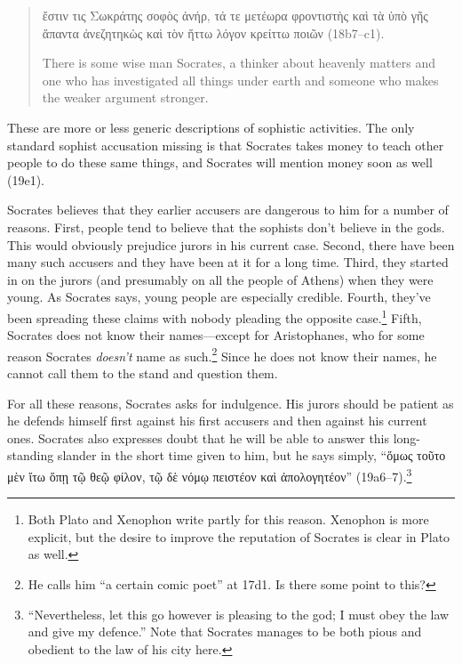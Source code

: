 \documentclass[11pt]{article}
\begin{document}
\begin{quote}
    {\g
    ἔστιν τις Σωκράτης σοφὸς ἀνήρ, τά τε μετέωρα φροντιστὴς καὶ τὰ ὑπὸ γῆς ἅπαντα ἀνεζητηκὼς καὶ τὸν ἥττω λόγον κρείττω ποιῶν
    } (18b7--c1).

    There is some wise man Socrates, a thinker about heavenly matters and one who has investigated all things under earth and someone who makes the weaker argument stronger.
\end{quote}

These are more or less generic descriptions of sophistic activities.  The only standard sophist accusation missing is that Socrates takes money to teach other people to do these same things, and Socrates will mention money soon as well (19e1).

Socrates believes that they earlier accusers are dangerous to him for a number of reasons.  First, people tend to believe that the sophists don't believe in the gods.  This would obviously prejudice jurors in his current case.  Second, there have been many such accusers and they have been at it for a long time.  Third, they started in on the jurors (and presumably on all the people of Athens) when they were young.  As Socrates says, young people are especially credible.  Fourth, they've been spreading these claims with nobody pleading the opposite case.\footnote{Both Plato and Xenophon write partly for this reason.  Xenophon is more explicit, but the desire to improve the reputation of Socrates is clear in Plato as well.}  Fifth, Socrates does not know their names---except for Aristophanes, who for some reason Socrates \emph{doesn't} name as such.\footnote{He calls him ``a certain comic poet'' at 17d1.  Is there some point to this?}  Since he does not know their names, he cannot call them to the stand and question them.

For all these reasons, Socrates asks for indulgence.  His jurors should be patient as he defends himself first against his first accusers and then against his current ones.  Socrates also expresses doubt that he will be able to answer this long-standing slander in the short time given to him, but he says simply, ``{\g ὅμως τοῦτο μὲν ἴτω ὅπῃ τῷ θεῷ φίλον, τῷ δὲ νόμῳ πειστέον καὶ ἀπολογητέον}'' (19a6--7).\footnote{``Nevertheless, let this go however is pleasing to the god; I must obey the law and give my defence.'' Note that Socrates manages to be both pious and obedient to the law of his city here.}


\end{document}
